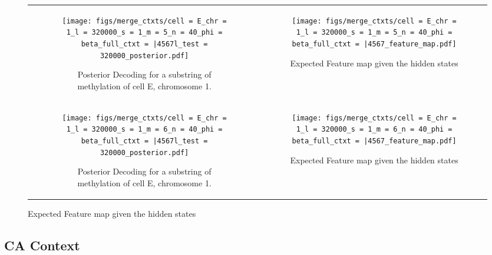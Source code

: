 \documentclass{article}
\begin{document}
    \begin{figure}[H]
        \begin{tabular}{cc}
          \begin{subfigure}[t]{0.4\textwidth}
            \texttt{[image: figs/merge\_ctxts/cell = E\_chr = 1\_l = 320000\_s = 1\_m = 5\_n = 40\_phi = beta\_full\_ctxt = |4567l\_test = 320000\_posterior.pdf]}
            \caption{Posterior Decoding for a substring of methylation of cell E, chromosome 1.}
          \end{subfigure}
          &
          \begin{subfigure}[t]{0.4\textwidth}
            \texttt{[image: figs/merge\_ctxts/cell = E\_chr = 1\_l = 320000\_s = 1\_m = 5\_n = 40\_phi = beta\_full\_ctxt = |4567\_feature\_map.pdf]}
            \caption{Expected Feature map given the hidden states}
          \end{subfigure}
      \\
      \begin{subfigure}[t]{0.4\textwidth}
        \texttt{[image: figs/merge\_ctxts/cell = E\_chr = 1\_l = 320000\_s = 1\_m = 6\_n = 40\_phi = beta\_full\_ctxt = |4567l\_test = 320000\_posterior.pdf]}
        \caption{Posterior Decoding for a substring of methylation of cell E, chromosome 1.}
      \end{subfigure}
      &
      \begin{subfigure}[t]{0.4\textwidth}
        \texttt{[image: figs/merge\_ctxts/cell = E\_chr = 1\_l = 320000\_s = 1\_m = 6\_n = 40\_phi = beta\_full\_ctxt = |4567\_feature\_map.pdf]}
        \caption{Expected Feature map given the hidden states}
      \end{subfigure}
    \end{tabular}
\end{figure}

\subsection{CA Context}
\end{document}
